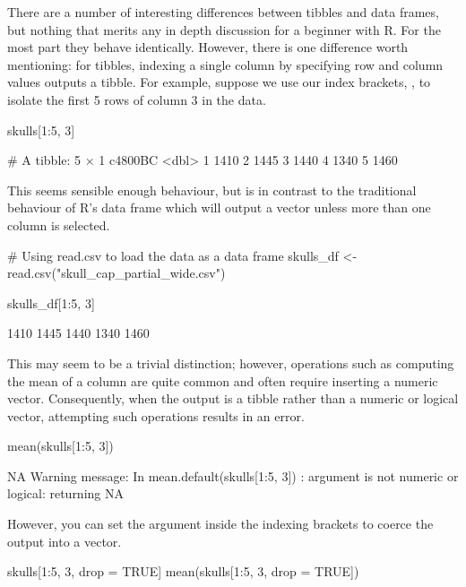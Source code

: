 \noindent
There are a number of interesting differences between tibbles and data frames, but nothing that merits any in depth discussion for a beginner with R. For the most part they behave identically. However, there is one difference worth mentioning: for tibbles, indexing a single column by specifying row and column values outputs a tibble. For example, suppose we use our index brackets, \R{[ ]}, to isolate the first 5 rows of column 3 in the  data.

\begin{inR}
skulls[1:5, 3]
\end{inR}

\begin{outR}
# A tibble: 5 × 1
  c4800BC
    <dbl>
1    1410
2    1445
3    1440
4    1340
5    1460
\end{outR}

\noindent This seems sensible enough behaviour, but is in contrast to the traditional behaviour of R's data frame which will output a vector unless more than one column is selected.

\begin{inR}
# Using read.csv to load the data as a data frame
skulls_df <- read.csv("skull_cap_partial_wide.csv")

skulls_df[1:5, 3]
\end{inR}

\begin{outR}
[1] 1410 1445 1440 1340 1460
\end{outR}

This may seem to be a trivial distinction; however, operations such as computing the mean of a column are quite common and often require inserting a numeric vector. Consequently, when the output is a tibble rather than a numeric or logical vector, attempting such operations results in an error.

\begin{inR}
mean(skulls[1:5, 3])
\end{inR}

\begin{outR}
[1] NA
Warning message:
In mean.default(skulls[1:5, 3]) :
  argument is not numeric or logical: returning NA
\end{outR}

\noindent However, you can set the argument  inside the indexing brackets to coerce the output into a vector.

\begin{inR}
skulls[1:5, 3, drop = TRUE]
mean(skulls[1:5, 3, drop = TRUE])
\end{inR}

